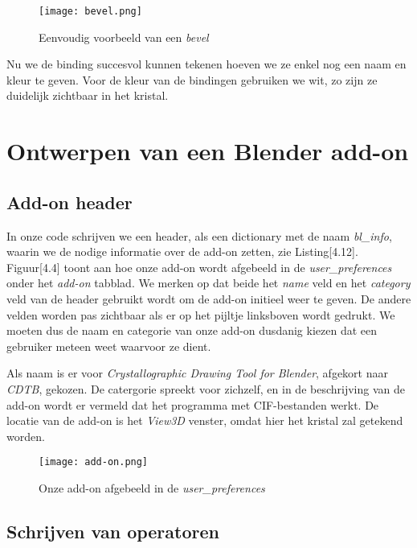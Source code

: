 \begin{figure}[H]
\begin{center}
\texttt{[image: bevel.png]}
\end{center}
\caption{Eenvoudig voorbeeld van een \textit{bevel}}
\end{figure}

Nu we de binding succesvol kunnen tekenen hoeven we ze enkel nog een naam en kleur te geven. Voor de kleur van de bindingen gebruiken we wit, zo zijn ze duidelijk zichtbaar in het kristal.

\section{Ontwerpen van een Blender add-on}

\subsection{Add-on header}

In onze code schrijven we een header, als een dictionary met de naam \textit{bl\_info}, waarin we de nodige informatie over de add-on zetten, zie Listing[4.12]. Figuur[4.4] toont aan hoe onze add-on wordt afgebeeld in de \textit{user\_preferences} onder het \textit{add-on} tabblad. We merken op dat beide het \textit{name} veld en het \textit{category} veld van de header gebruikt wordt om de add-on initieel weer te geven. De andere velden worden pas zichtbaar als er op het pijltje linksboven wordt gedrukt. We moeten dus de naam en categorie van onze add-on dusdanig kiezen dat een gebruiker meteen weet waarvoor ze dient. 



Als naam is er voor \textit{Crystallographic Drawing Tool for Blender}, afgekort naar \textit{CDTB}, gekozen. De catergorie spreekt voor zichzelf, en in de beschrijving van de add-on wordt er vermeld dat het programma met CIF-bestanden werkt. De locatie van de add-on is het \textit{View3D} venster, omdat hier het kristal zal  getekend worden.

\begin{figure}[H]
\texttt{[image: add-on.png]}
\caption{Onze add-on afgebeeld in de \textit{user\_preferences}}
\end{figure}

\subsection{Schrijven van operatoren}

